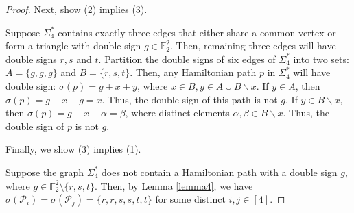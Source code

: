 \documentclass[12pt]{amsart}
\theoremstyle{plain}
\theoremstyle{definition}%
\begin{document}
\begin{proof}
Next, show (2) implies (3). 

Suppose \(\Sigma_4^*\) contains exactly three edges that either share a common vertex or form a triangle with double sign \(g \in \mathbb{F}_2^2\). Then, remaining three edges will have double signs $r,s$ and $t$.
Partition the double signs of six edges of \(\Sigma_4^*\) into two sets: $A=\{g,g,g\}$ and $B=\{r,s,t\}$. Then, any Hamiltonian path $p$ in \(\Sigma_4^*\) will have double sign: $\sigma(p)=g+x+y$, where $ x\in B, y\in A\cup B\backslash x$. If $y\in A$, then  $\sigma(p)=g+x+g=x$. Thus, the  double sign of this path is not $g$. If $y\in B\backslash x$, then $\sigma(p)=g+x+\alpha=\beta$, where distinct elements $\alpha,\beta\in B\backslash x$. Thus, the  double sign of $p$ is not $g$. 

Finally, we show (3) implies (1).

Suppose the graph $\Sigma_4^*$ does not contain a Hamiltonian path with a double sign $g$, where $g \in \mathbb{F}_2^2 \setminus \{r,s,t\}$. Then, by Lemma \ref{lemma4}, we have  $\sigma(\mathscr{P}_i)=\sigma(\mathscr{P}_j)=\{r,r,s,s,t,t\}$ for some distinct $i,j\in[4]$.
\end{proof}
\end{document}
